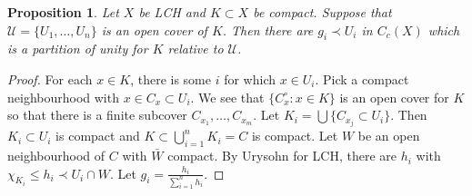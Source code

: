 \documentclass[11pt]{amsart}
\newtheorem{proposition}[theorem]{Proposition}
\theoremstyle{definition}
\numberwithin{equation}{section}
\begin{document}
\begin{proposition}
    Let $X$ be LCH and $K\subset X$ be compact. Suppose that $\mathcal U=\{U_1,\ldots,U_n\}$ is an open cover of $K$. Then there are $g_i\prec U_i$ in $C_c(X)$ which is a partition of unity for $K$ relative to $\mathcal U$.
\end{proposition}
\begin{proof}
    For each $x\in K$, there is some $i$ for which $x\in U_i$. Pick a compact neighbourhood with $x\in C_x\subset U_i$. We see that $\{C_x^\circ:x\in K\}$ is an open cover for $K$ so that there is a finite subcover $C_{x_1},\ldots,C_{x_m}$. Let $K_i=\bigcup\{C_{x_j}\subset U_i\}$. Then $K_i\subset U_i$ is compact and $K\subset\bigcup_{i=1}^nK_i=C$ is compact. Let $W$ be an open neighbourhood of $C$ with $\bar W$ compact. By Urysohn for LCH, there are $h_i$ with $\chi_{K_i}\le h_i\prec U_i\cap W$. Let $g_i=\frac{h_i}{\sum_{i=1}^nh_i}$.
\end{proof}
\end{document}
